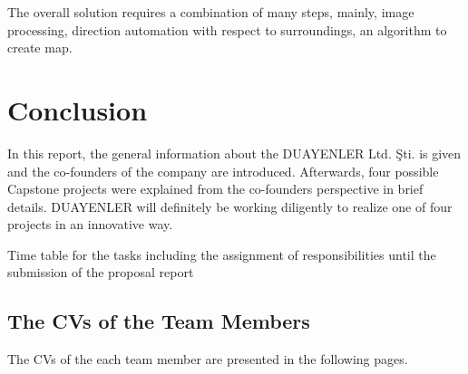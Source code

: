 \documentclass[a4paper,12pt]{article}
\begin{document}
The overall solution requires a combination of many steps, mainly, image processing, direction automation with respect to surroundings, an algorithm to create map.


\section{Conclusion}
	In this report, the general information about the DUAYENLER Ltd. Şti. is given and the co-founders of the company are introduced. Afterwards, four possible Capstone projects were explained from the co-founders perspective in brief details. DUAYENLER will definitely be working diligently to realize one of four projects in an innovative way.

Time table for the tasks including the assignment of responsibilities until the submission of the proposal report

\begin{appendices}
	\renewcommand\thefigure{\thesection.\arabic{figure}}
	\setcounter{figure}{0}
	\section{The CVs of the Team Members}\label{appendix-cvs}
	The CVs of the each team member are presented in the following pages.
	
	
\end{appendices}

%
%





\end{document}
